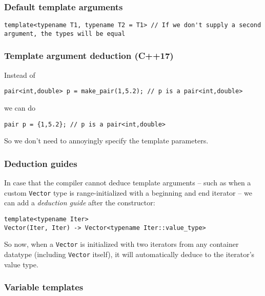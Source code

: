 \documentclass[8pt, table, xcdraw]{article}%
\begin{document}
\subsubsection{Default template arguments} \label{default_template_arguments}

\begin{lstlisting}
template<typename T1, typename T2 = T1> // If we don't supply a second argument, the types will be equal
\end{lstlisting}

\subsubsection{Template argument deduction (C++17)}

Instead of

\begin{lstlisting}
pair<int,double> p = make_pair(1,5.2); // p is a pair<int,double>
\end{lstlisting}

we can do

\begin{lstlisting}
pair p = {1,5.2}; // p is a pair<int,double>
\end{lstlisting}

So we don't need to annoyingly specify the template parameters.

\subsubsection{Deduction guides}

In case that the compiler cannot deduce template arguments -- such as when a custom \lstinline{Vector} type is range-initialized with a beginning and end iterator -- we can add a \emph{deduction guide} after the constructor:

\begin{lstlisting}
template<typename Iter>
Vector(Iter, Iter) -> Vector<typename Iter::value_type>
\end{lstlisting}

So now, when a \lstinline{Vector} is initialized with two iterators from any container datatype (including \lstinline{Vector} itself), it will automatically deduce to the iterator's value type.

\subsubsection{Variable templates}
\end{document}
